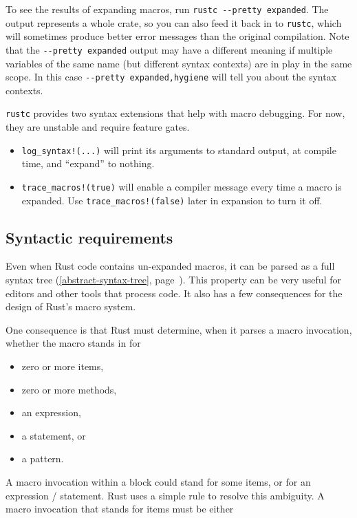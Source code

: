 \documentclass[a4paper,]{book}
\renewcommand*{\hyperref}[2][\ar]{%
  \def\ar{#2}%
  #2 (\autoref{#1}, page~\pageref{#1})}
\providecommand{\tightlist}{%
  \setlength{\itemsep}{0pt}\setlength{\parskip}{0pt}}
\begin{document}
To see the results of expanding macros, run
\texttt{rustc\ -\/-pretty\ expanded}. The output represents a whole
crate, so you can also feed it back in to \texttt{rustc}, which will
sometimes produce better error messages than the original compilation.
Note that the \texttt{-\/-pretty\ expanded} output may have a different
meaning if multiple variables of the same name (but different syntax
contexts) are in play in the same scope. In this case
\texttt{-\/-pretty\ expanded,hygiene} will tell you about the syntax
contexts.

\texttt{rustc} provides two syntax extensions that help with macro
debugging. For now, they are unstable and require feature gates.

\begin{itemize}
\item
  \texttt{log\_syntax!(...)} will print its arguments to standard
  output, at compile time, and ``expand'' to nothing.
\item
  \texttt{trace\_macros!(true)} will enable a compiler message every
  time a macro is expanded. Use \texttt{trace\_macros!(false)} later in
  expansion to turn it off.
\end{itemize}

\subsection{Syntactic requirements}\label{syntactic-requirements}

Even when Rust code contains un-expanded macros, it can be parsed as a
full \hyperref[abstract-syntax-tree]{syntax tree}. This property can be
very useful for editors and other tools that process code. It also has a
few consequences for the design of Rust's macro system.

One consequence is that Rust must determine, when it parses a macro
invocation, whether the macro stands in for

\begin{itemize}
\tightlist
\item
  zero or more items,
\item
  zero or more methods,
\item
  an expression,
\item
  a statement, or
\item
  a pattern.
\end{itemize}

A macro invocation within a block could stand for some items, or for an
expression / statement. Rust uses a simple rule to resolve this
ambiguity. A macro invocation that stands for items must be either
\end{document}
